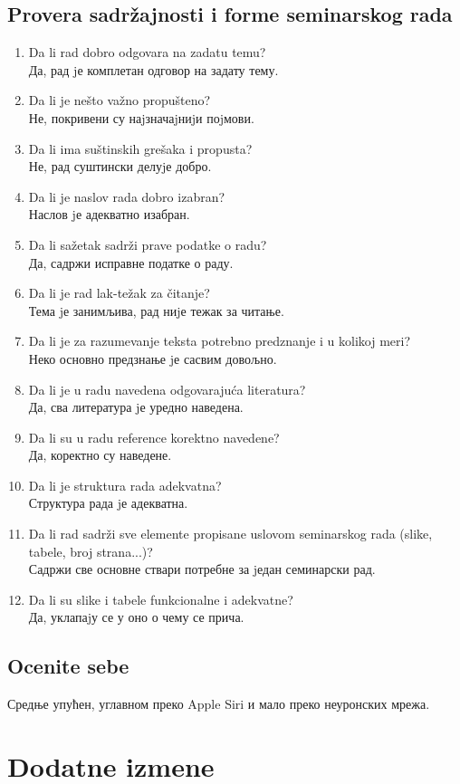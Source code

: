 \documentclass[a4paper]{report}
\begin{document}
\section{Provera sadržajnosti i forme seminarskog rada}
\begin{enumerate}
\item Da li rad dobro odgovara na zadatu temu?\\
Да, рад jе комплетан одговор на задату тему.
\item Da li je nešto važno propušteno?\\
Не, покривени су наjзначаjниjи поjмови.
\item Da li ima suštinskih grešaka i propusta?\\
Не, рад суштински делуjе добро.
\item Da li je naslov rada dobro izabran?\\
Наслов jе адекватно изабран.
\item Da li sažetak sadrži prave podatke o radu?\\
Да, садржи исправне податке о раду.
\item Da li je rad lak-težak za čitanje?\\
Тема jе занимљива, рад ниjе тежак за читање.
\item Da li je za razumevanje teksta potrebno predznanje i u kolikoj meri?\\
Неко основно предзнање jе сасвим довољно.
\item Da li je u radu navedena odgovarajuća literatura?\\
Да, сва литература jе уредно наведена.
\item Da li su u radu reference korektno navedene?\\
Да, коректно су наведене.
\item Da li je struktura rada adekvatna?\\
Структура рада jе адекватна.
\item Da li rad sadrži sve elemente propisane uslovom seminarskog rada (slike, tabele, broj strana...)?\\
Садржи све основне ствари потребне за jедан семинарски рад.
\item Da li su slike i tabele funkcionalne i adekvatne?\\
Да, уклапаjу се у оно о чему се прича.
\end{enumerate}

\section{Ocenite sebe}
Средње упућен, углавном преко Apple Siri и мало преко неуронских мрежа.

\chapter{Dodatne izmene}
\end{document}
